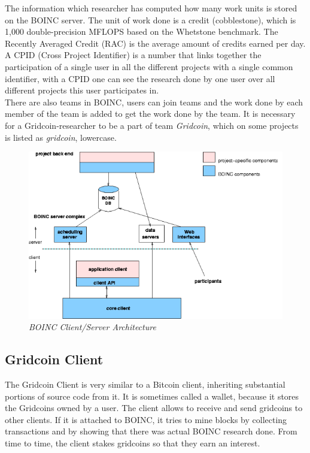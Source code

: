 The information which researcher has computed how many work units is stored on the BOINC server. The unit of work done is a credit (cobblestone), which is 1,000 double-precision MFLOPS based on the Whetstone benchmark.  The Recently Averaged Credit (RAC) is the average amount of credits earned per day.\\

A CPID (Cross Project Identifier) is a number that links together the participation of a single user in all the different projects with a single common identifier, with a CPID one can see the research done by one user over all different projects this user participates in.\\

There are also teams in BOINC, users can join teams and the work done by each member of the team is added to get the work done by the team. It is necessary for a Gridcoin-researcher to be a part of team \textit{Gridcoin}, which on some projects is listed as \textit{gridcoin}, lowercase.

\begin{figure}
\centering
\includegraphics{figures/project_boinc}
\medskip
\caption{\textit{BOINC Client/Server Architecture}}
\small
\end{figure}

\subsection{Gridcoin Client}

The Gridcoin Client is very similar to a Bitcoin client, inheriting substantial portions of source code from it. It is sometimes called a wallet, because it stores the Gridcoins owned by a user. The client allows to receive and send gridcoins to other clients. If it is attached to BOINC, it tries to mine blocks by collecting transactions and by showing that there was actual BOINC research done. From time to time, the client stakes gridcoins so that they earn an interest.

